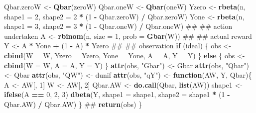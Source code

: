 \documentclass[]{article}
\newenvironment{Shaded}{\begin{snugshade}}{\end{snugshade}}
\newcommand{\ControlFlowTok}[1]{\textcolor[rgb]{0.13,0.29,0.53}{\textbf{#1}}}
\newcommand{\DataTypeTok}[1]{\textcolor[rgb]{0.13,0.29,0.53}{#1}}
\newcommand{\DecValTok}[1]{\textcolor[rgb]{0.00,0.00,0.81}{#1}}
\newcommand{\KeywordTok}[1]{\textcolor[rgb]{0.13,0.29,0.53}{\textbf{#1}}}
\newcommand{\NormalTok}[1]{#1}
\newcommand{\OperatorTok}[1]{\textcolor[rgb]{0.81,0.36,0.00}{\textbf{#1}}}
\newcommand{\StringTok}[1]{\textcolor[rgb]{0.31,0.60,0.02}{#1}}
\theoremstyle{definition}
\theoremstyle{definition}
\theoremstyle{definition}
\theoremstyle{remark}
\begin{document}
\begin{Shaded}
\begin{Highlighting}[]
\NormalTok{  Qbar.zeroW <-}\StringTok{ }\KeywordTok{Qbar}\NormalTok{(zeroW)}
\NormalTok{  Qbar.oneW <-}\StringTok{ }\KeywordTok{Qbar}\NormalTok{(oneW)}
\NormalTok{  Yzero <-}\StringTok{ }\KeywordTok{rbeta}\NormalTok{(n, }\DataTypeTok{shape1 =} \DecValTok{2}\NormalTok{, }\DataTypeTok{shape2 =} \DecValTok{2} \OperatorTok{*}\StringTok{ }\NormalTok{(}\DecValTok{1} \OperatorTok{-}\StringTok{ }\NormalTok{Qbar.zeroW) }\OperatorTok{/}\StringTok{ }\NormalTok{Qbar.zeroW)}
\NormalTok{  Yone <-}\StringTok{ }\KeywordTok{rbeta}\NormalTok{(n, }\DataTypeTok{shape1 =} \DecValTok{3}\NormalTok{, }\DataTypeTok{shape2 =} \DecValTok{3} \OperatorTok{*}\StringTok{ }\NormalTok{(}\DecValTok{1} \OperatorTok{-}\StringTok{ }\NormalTok{Qbar.oneW) }\OperatorTok{/}\StringTok{ }\NormalTok{Qbar.oneW)}
\NormalTok{  ## ## action undertaken}
\NormalTok{  A <-}\StringTok{ }\KeywordTok{rbinom}\NormalTok{(n, }\DataTypeTok{size =} \DecValTok{1}\NormalTok{, }\DataTypeTok{prob =} \KeywordTok{Gbar}\NormalTok{(W))}
\NormalTok{  ## ## actual reward}
\NormalTok{  Y <-}\StringTok{ }\NormalTok{A }\OperatorTok{*}\StringTok{ }\NormalTok{Yone }\OperatorTok{+}\StringTok{ }\NormalTok{(}\DecValTok{1} \OperatorTok{-}\StringTok{ }\NormalTok{A) }\OperatorTok{*}\StringTok{ }\NormalTok{Yzero}
\NormalTok{  ## ## observation}
  \ControlFlowTok{if}\NormalTok{ (ideal) \{}
\NormalTok{    obs <-}\StringTok{ }\KeywordTok{cbind}\NormalTok{(}\DataTypeTok{W =}\NormalTok{ W, }\DataTypeTok{Yzero =}\NormalTok{ Yzero, }\DataTypeTok{Yone =}\NormalTok{ Yone, }\DataTypeTok{A =}\NormalTok{ A, }\DataTypeTok{Y =}\NormalTok{ Y)}
\NormalTok{  \} }\ControlFlowTok{else}\NormalTok{ \{}
\NormalTok{    obs <-}\StringTok{ }\KeywordTok{cbind}\NormalTok{(}\DataTypeTok{W =}\NormalTok{ W, }\DataTypeTok{A =}\NormalTok{ A, }\DataTypeTok{Y =}\NormalTok{ Y)}
\NormalTok{  \}}
  \KeywordTok{attr}\NormalTok{(obs, }\StringTok{"Gbar"}\NormalTok{) <-}\StringTok{ }\NormalTok{Gbar}
  \KeywordTok{attr}\NormalTok{(obs, }\StringTok{"Qbar"}\NormalTok{) <-}\StringTok{ }\NormalTok{Qbar}
  \KeywordTok{attr}\NormalTok{(obs, }\StringTok{"QW"}\NormalTok{) <-}\StringTok{ }\NormalTok{dunif}
  \KeywordTok{attr}\NormalTok{(obs, }\StringTok{"qY"}\NormalTok{) <-}\StringTok{ }\ControlFlowTok{function}\NormalTok{(AW, Y, Qbar)\{}
\NormalTok{    A <-}\StringTok{ }\NormalTok{AW[, }\DecValTok{1}\NormalTok{]}
\NormalTok{    W <-}\StringTok{ }\NormalTok{AW[, }\DecValTok{2}\NormalTok{]}
\NormalTok{    Qbar.AW <-}\StringTok{ }\KeywordTok{do.call}\NormalTok{(Qbar, }\KeywordTok{list}\NormalTok{(AW))}
\NormalTok{    shape1 <-}\StringTok{ }\KeywordTok{ifelse}\NormalTok{(A }\OperatorTok{==}\StringTok{ }\DecValTok{0}\NormalTok{, }\DecValTok{2}\NormalTok{, }\DecValTok{3}\NormalTok{)}
    \KeywordTok{dbeta}\NormalTok{(Y, }\DataTypeTok{shape1 =}\NormalTok{ shape1, }\DataTypeTok{shape2 =}\NormalTok{ shape1 }\OperatorTok{*}\StringTok{ }\NormalTok{(}\DecValTok{1} \OperatorTok{-}\StringTok{ }\NormalTok{Qbar.AW) }\OperatorTok{/}\StringTok{ }\NormalTok{Qbar.AW)}
\NormalTok{  \}}
\NormalTok{  ##}
  \KeywordTok{return}\NormalTok{(obs)}
\NormalTok{\}}
\end{Highlighting}
\end{Shaded}
\end{document}
